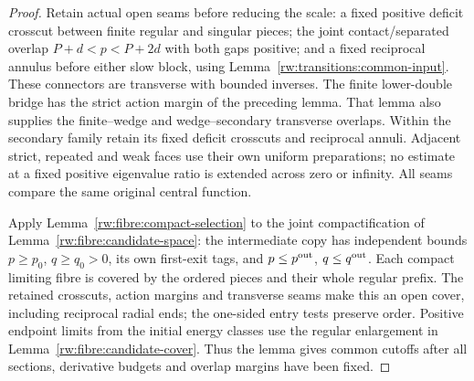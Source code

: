 \begin{proof}
Retain actual open seams before reducing the scale: a fixed positive
deficit crosscut between finite regular and singular pieces; the
joint contact/separated overlap $P+d<p<P+2d$ with both gaps
positive; and a fixed reciprocal annulus before either slow block,
using Lemma~\ref{rw:transitions:common-input}. These connectors
are transverse with bounded inverses. The finite lower-double
bridge has the strict action margin of the preceding lemma.
That lemma also supplies the finite--wedge and wedge--secondary
transverse overlaps. Within the secondary family retain its fixed
deficit crosscuts and reciprocal annuli. Adjacent strict, repeated
and weak faces use their own uniform preparations; no estimate at
a fixed positive eigenvalue ratio is extended across zero or infinity.
All seams compare the same original central function.

Apply Lemma~\ref{rw:fibre:compact-selection} to the joint compactification
of Lemma~\ref{rw:fibre:candidate-space}: the intermediate copy has
independent bounds $p\ge p_0$, $q\ge q_0>0$, its own first-exit tags,
and $p\le p^{\rm out}$, $q\le q^{\rm out}$. Each compact limiting
fibre is covered by the ordered pieces and their whole regular prefix.
The retained crosscuts, action margins and transverse seams make this
an open cover, including reciprocal radial ends; the one-sided entry
tests preserve order. Positive endpoint limits from the initial energy
classes use the regular enlargement in
Lemma~\ref{rw:fibre:candidate-cover}. Thus the lemma gives common
cutoffs after all sections, derivative budgets and overlap margins
have been fixed.
\end{proof}
